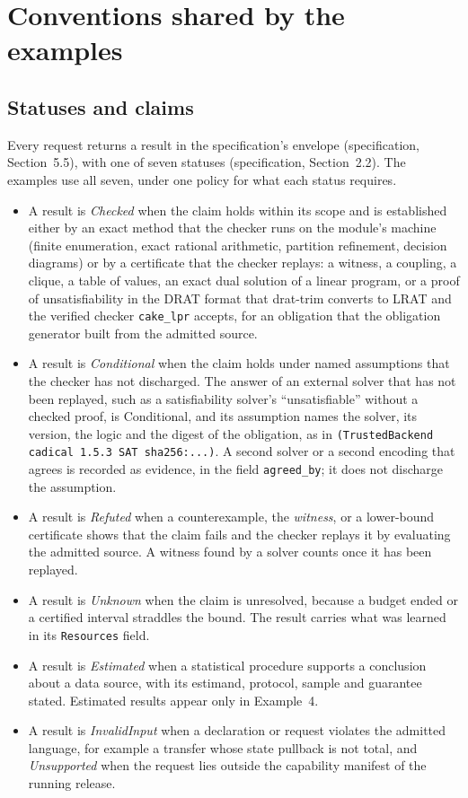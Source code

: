 \documentclass[11pt]{article}
\newcommand{\code}[1]{\texttt{#1}}
\newcommand{\spec}[1]{specification, Section~#1}
\theoremstyle{definition}
\theoremstyle{plain}
\begin{document}
\section{Conventions shared by the examples}\label{sec:conventions}

\subsection{Statuses and claims}\label{sec:statuses}

Every request returns a result in the specification's envelope (\spec{5.5}), with one of seven
statuses (\spec{2.2}). The examples use all seven, under one policy for what each status requires.
\begin{itemize}
\item A result is \emph{Checked} when the claim holds within its scope and is established either by
an exact method that the checker runs on the module's machine (finite enumeration, exact rational
arithmetic, partition refinement, decision diagrams) or by a certificate that the checker replays:
a witness, a coupling, a clique, a table of values, an exact dual solution of a linear program, or a
proof of unsatisfiability in the DRAT format that drat-trim converts to LRAT and the verified checker
\code{cake\_lpr} accepts, for an obligation that the obligation generator built from the admitted
source.
\item A result is \emph{Conditional} when the claim holds under named assumptions that the checker
has not discharged. The answer of an external solver that has not been replayed, such as a
satisfiability solver's ``unsatisfiable'' without a checked proof, is Conditional, and its
assumption names the solver, its version, the logic and the digest of the obligation, as in
\code{(TrustedBackend cadical 1.5.3 SAT sha256:...)}. A second solver or a second encoding that
agrees is recorded as evidence, in the field \code{agreed\_by}; it does not discharge the
assumption.
\item A result is \emph{Refuted} when a counterexample, the \emph{witness}, or a lower-bound
certificate shows that the claim fails and the checker replays it by evaluating the admitted source.
A witness found by a solver counts once it has been replayed.
\item A result is \emph{Unknown} when the claim is unresolved, because a budget ended or a
certified interval straddles the bound. The result carries what was learned in its
\code{Resources} field.
\item A result is \emph{Estimated} when a statistical procedure supports a conclusion about a data
source, with its estimand, protocol, sample and guarantee stated. Estimated results appear only in
Example~4.
\item A result is \emph{InvalidInput} when a declaration or request violates the admitted language,
for example a transfer whose state pullback is not total, and \emph{Unsupported} when the request
lies outside the capability manifest of the running release.
\end{itemize}
\end{document}

